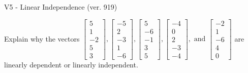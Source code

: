 \begin{exercise}
  \begin{exerciseTitle}V5 - Linear Independence (ver. 919)\end{exerciseTitle}
  \begin{exerciseStatement}
    Explain why the vectors \(\left[\begin{array}{r}
5 \\
1 \\
-2 \\
5 \\
3
\end{array}\right] , \left[\begin{array}{r}
-5 \\
2 \\
-3 \\
1 \\
-6
\end{array}\right] , \left[\begin{array}{r}
5 \\
-6 \\
-1 \\
3 \\
5
\end{array}\right] , \left[\begin{array}{r}
-4 \\
0 \\
2 \\
-3 \\
-4
\end{array}\right] , \text{ and } \left[\begin{array}{r}
-2 \\
1 \\
-6 \\
4 \\
0
\end{array}\right]\) are linearly dependent or linearly independent.	



\end{exerciseStatement}
\end{exercise}
